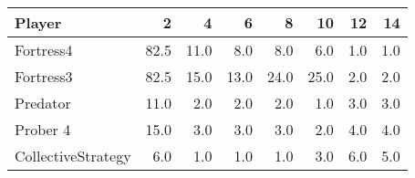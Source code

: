 \begin{tabular}{lrrrrrrr}
\toprule
             Player &     2 &     4 &     6 &     8 &    10 &   12 &   14 \\
\midrule
          Fortress4 &  82.5 &  11.0 &   8.0 &   8.0 &   6.0 &  1.0 &  1.0 \\
          Fortress3 &  82.5 &  15.0 &  13.0 &  24.0 &  25.0 &  2.0 &  2.0 \\
           Predator &  11.0 &   2.0 &   2.0 &   2.0 &   1.0 &  3.0 &  3.0 \\
           Prober 4 &  15.0 &   3.0 &   3.0 &   3.0 &   2.0 &  4.0 &  4.0 \\
 CollectiveStrategy &   6.0 &   1.0 &   1.0 &   1.0 &   3.0 &  6.0 &  5.0 \\
\bottomrule
\end{tabular}
